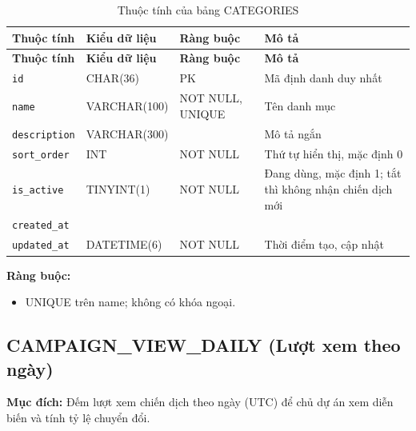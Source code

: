 {\small
\begin{longtable}{|P{3.2cm}|P{2.8cm}|P{2.2cm}|p{5.4cm}|}
    \caption{Thuộc tính của bảng CATEGORIES}
    \label{tab:categories} \\
    \hline
    \textbf{Thuộc tính} & \textbf{Kiểu dữ liệu} & \textbf{Ràng buộc} & \textbf{Mô tả} \\
    \hline
    \endfirsthead
    \hline
    \textbf{Thuộc tính} & \textbf{Kiểu dữ liệu} & \textbf{Ràng buộc} & \textbf{Mô tả} \\
    \hline
    \endhead

    \texttt{id} & CHAR(36) & PK & Mã định danh duy nhất \\
    \hline
    \texttt{name} & VARCHAR(100) & NOT NULL, UNIQUE & Tên danh mục \\
    \hline
    \texttt{description} & VARCHAR(300) &  & Mô tả ngắn \\
    \hline
    \texttt{sort\_\allowbreak{}order} & INT & NOT NULL & Thứ tự hiển thị, mặc định 0 \\
    \hline
    \texttt{is\_\allowbreak{}active} & TINYINT(1) & NOT NULL & Đang dùng, mặc định 1; tắt thì không nhận chiến dịch mới \\
    \hline
    \texttt{created\_\allowbreak{}at} &  &  &  \\
    \hline
    \texttt{updated\_\allowbreak{}at} & DATETIME(6) & NOT NULL & Thời điểm tạo, cập nhật \\
    \hline
\end{longtable}
}

\textbf{Ràng buộc:}
\begin{itemize}
    \item UNIQUE trên name; không có khóa ngoại.
\end{itemize}

\subsection{CAMPAIGN\_\allowbreak{}VIEW\_\allowbreak{}DAILY (Lượt xem theo ngày)}

\textbf{Mục đích:} Đếm lượt xem chiến dịch theo ngày (UTC) để chủ dự án xem diễn biến và tính tỷ lệ chuyển đổi.

